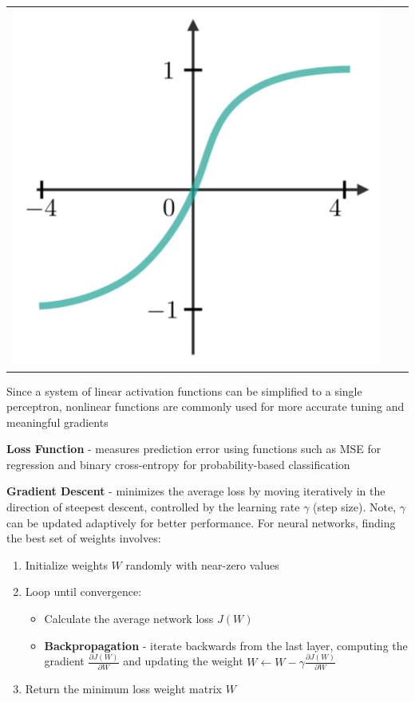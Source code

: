 \documentclass[10pt,landscape]{article}
\begin{document}
\begin{multicols}{3}
\begin{center}
\begin{tabular}{c|c|c}
         \includegraphics[scale = .047]{images/tanh.JPG} 
         
\end{tabular}
\end{center}
Since a system of linear activation functions can be simplified to a single perceptron, nonlinear functions are commonly used for more accurate tuning and meaningful gradients

\smallskip
\textbf{Loss Function} - measures prediction error using functions such as MSE for regression and binary cross-entropy for probability-based classification

\smallskip
\textbf{Gradient Descent} - minimizes the average loss by moving iteratively in the direction of steepest descent, controlled by the learning rate $\gamma$ (step size). Note, $\gamma$ can be updated adaptively for better performance. For neural networks, finding the best set of weights involves: 
\begin{enumerate}[leftmargin=5mm]
\itemsep -.4mm 
\item Initialize weights $W$ randomly with near-zero values
\item Loop until convergence:
    \begin{itemize}[label={--},leftmargin=4mm]
    \itemsep -.4mm 
    \item Calculate the average network loss $J(W)$ 
    \item \textbf{Backpropagation} - iterate backwards from the last layer, computing the gradient $\frac{\partial J(W)}{\partial W}$ and updating the weight $W \leftarrow W - \gamma \frac{\partial J(W)}{\partial W}$
    \end{itemize}
\item Return the minimum loss weight matrix $W$ 
\end{enumerate}


\end{multicols}
\end{document}
